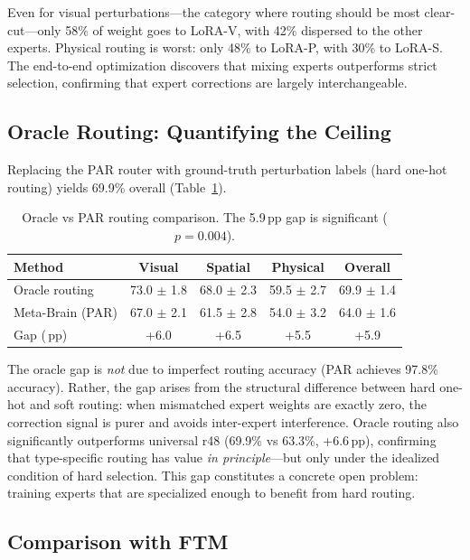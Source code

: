 \documentclass[letterpaper]{article}
\newcommand{\ours}{Meta-Brain}
\newcommand{\pp}{\,\text{pp}}
\begin{document}
Even for visual perturbations---the category where routing should be most clear-cut---only 58\% of weight goes to LoRA-V, with 42\% dispersed to the other experts. Physical routing is worst: only 48\% to LoRA-P, with 30\% to LoRA-S. The end-to-end optimization discovers that mixing experts outperforms strict selection, confirming that expert corrections are largely interchangeable.

\subsection{Oracle Routing: Quantifying the Ceiling}
\label{sec:oracle}

Replacing the PAR router with ground-truth perturbation labels (hard one-hot routing) yields 69.9\% overall (Table~\ref{tab:oracle}).

\begin{table}[h]
\centering
\caption{Oracle vs PAR routing comparison. The 5.9$\pp$ gap is significant ($p=0.004$).}
\label{tab:oracle}
\small
\begin{tabular}{lcccc}
\toprule
\textbf{Method} & \textbf{Visual} & \textbf{Spatial} & \textbf{Physical} & \textbf{Overall} \\
\midrule
Oracle routing & 73.0 $\pm$ 1.8 & 68.0 $\pm$ 2.3 & 59.5 $\pm$ 2.7 & 69.9 $\pm$ 1.4 \\
\ours{} (PAR) & 67.0 $\pm$ 2.1 & 61.5 $\pm$ 2.8 & 54.0 $\pm$ 3.2 & 64.0 $\pm$ 1.6 \\
Gap ($\pp$) & +6.0 & +6.5 & +5.5 & +5.9 \\
\bottomrule
\end{tabular}
\end{table}

The oracle gap is \emph{not} due to imperfect routing accuracy (PAR achieves 97.8\% accuracy). Rather, the gap arises from the structural difference between hard one-hot and soft routing: when mismatched expert weights are exactly zero, the correction signal is purer and avoids inter-expert interference. Oracle routing also significantly outperforms universal r48 (69.9\% vs 63.3\%, +6.6$\pp$), confirming that type-specific routing has value \emph{in principle}---but only under the idealized condition of hard selection. This gap constitutes a concrete open problem: training experts that are specialized enough to benefit from hard routing.

\subsection{Comparison with FTM}
\label{sec:ftm}
\end{document}
